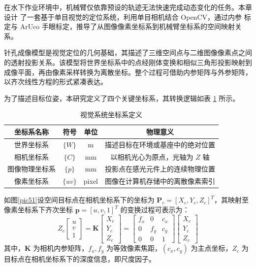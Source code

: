 


在水下作业环境中，机械臂仅依靠预设的轨迹无法快速完成动态变化的任务。本章设计
了一套基于单目视觉的定位系统，利用单目相机结合 OpenCV，通过内参
标定与 ArUco 手眼标定，推导了从图像像素坐标系到机械臂坐标系的空间映射关系。

针孔成像模型是视觉定位的几何基础，其描述了三维空间点与二维图像像素点之间的透射投影关系。该模型将世界坐标系中的点经刚体变换和相似三角形投影映射到成像平面，再由像素采样转换为离散坐标。整个过程可借助内参矩阵与外参矩阵，以齐次线性方程的形式紧凑表达。

  为了描述目标位姿，本研究定义了四个关键坐标系，其转换逻辑如表 \ref{tab:coordinates} 所示。

  \begin{table}[htbp]
    \centering
    \caption{视觉系统坐标系定义}
    \label{tab:coordinates}
    \begin{tabular}{cccc}
        \toprule[1.5pt]   %
        坐标系名称 & 符号 & 单位 & 物理意义 \\
        \midrule
        世界坐标系 & $\{W\}$ & m & 描述目标在环境或基座中的绝对位置 \\
        相机坐标系 & $\{C\}$ & mm & 以相机光心为原点，光轴为 $Z$ 轴 \\
        图像物理坐标系 & $\{p\}$ & mm & 投影点在感光元件上的连续物理位置 \\
        像素坐标系 & $\{uv\}$ & pixel & 图像在计算机存储中的离散像素索引 \\
        \bottomrule[1.5pt] %
    \end{tabular}
\end{table}
如图\ref{pic51}设空间目标点在相机坐标系下的坐标为 $\mathbf{P}_c = [X_c, Y_c, Z_c]^T$，其映射至像素坐标系下齐次坐标 $\mathbf{p} = [u, v, 1]^T$ 的变换过程可表示为：
\begin{equation}
    Z_c \begin{bmatrix} u \\ v \\ 1 \end{bmatrix} = \mathbf{K} \begin{bmatrix} X_c \\ Y_c \\ Z_c \end{bmatrix} = \begin{bmatrix} f_x & 0 & c_x \\ 0 & f_y & c_y \\ 0 & 0 & 1 \end{bmatrix} \begin{bmatrix} X_c \\ Y_c \\ Z_c \end{bmatrix}
\end{equation}
其中，$\mathbf{K}$ 为相机内参矩阵，$f_x, f_y$ 为等效像素焦距，$(c_x, c_y)$ 为主点坐标，$Z_c$ 为目标点在相机坐标系下的深度信息，即尺度因子。

